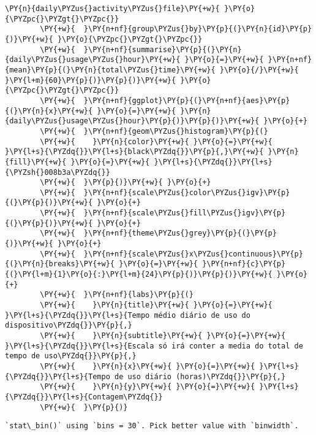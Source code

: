 \begin{tcolorbox}[breakable, size=fbox, boxrule=1pt, pad at break*=1mm,colback=cellbackground, colframe=cellborder]
    \begin{Verbatim}[commandchars=\\\{\}]
        \PY{n}{daily\PYZus{}activity\PYZus{}file}\PY{+w}{ }\PY{o}{\PYZpc{}\PYZgt{}\PYZpc{}}
        \PY{+w}{  }\PY{n+nf}{group\PYZus{}by}\PY{p}{(}\PY{n}{id}\PY{p}{)}\PY{+w}{ }\PY{o}{\PYZpc{}\PYZgt{}\PYZpc{}}
        \PY{+w}{  }\PY{n+nf}{summarise}\PY{p}{(}\PY{n}{daily\PYZus{}usage\PYZus{}hour}\PY{+w}{ }\PY{o}{=}\PY{+w}{ }\PY{n+nf}{mean}\PY{p}{(}\PY{n}{total\PYZus{}time}\PY{+w}{ }\PY{o}{/}\PY{+w}{ }\PY{l+m}{60}\PY{p}{)}\PY{p}{)}\PY{+w}{ }\PY{o}{\PYZpc{}\PYZgt{}\PYZpc{}}
        \PY{+w}{  }\PY{n+nf}{ggplot}\PY{p}{(}\PY{n+nf}{aes}\PY{p}{(}\PY{n}{x}\PY{+w}{ }\PY{o}{=}\PY{+w}{ }\PY{n}{daily\PYZus{}usage\PYZus{}hour}\PY{p}{)}\PY{p}{)}\PY{+w}{ }\PY{o}{+}
        \PY{+w}{  }\PY{n+nf}{geom\PYZus{}histogram}\PY{p}{(}
        \PY{+w}{    }\PY{n}{color}\PY{+w}{ }\PY{o}{=}\PY{+w}{ }\PY{l+s}{\PYZdq{}}\PY{l+s}{black\PYZdq{}}\PY{p}{,}\PY{+w}{ }\PY{n}{fill}\PY{+w}{ }\PY{o}{=}\PY{+w}{ }\PY{l+s}{\PYZdq{}}\PY{l+s}{\PYZsh{}008b3a\PYZdq{}}
        \PY{+w}{  }\PY{p}{)}\PY{+w}{ }\PY{o}{+}
        \PY{+w}{  }\PY{n+nf}{scale\PYZus{}color\PYZus{}igv}\PY{p}{(}\PY{p}{)}\PY{+w}{ }\PY{o}{+}
        \PY{+w}{  }\PY{n+nf}{scale\PYZus{}fill\PYZus{}igv}\PY{p}{(}\PY{p}{)}\PY{+w}{ }\PY{o}{+}
        \PY{+w}{  }\PY{n+nf}{theme\PYZus{}grey}\PY{p}{(}\PY{p}{)}\PY{+w}{ }\PY{o}{+}
        \PY{+w}{  }\PY{n+nf}{scale\PYZus{}x\PYZus{}continuous}\PY{p}{(}\PY{n}{breaks}\PY{+w}{ }\PY{o}{=}\PY{+w}{ }\PY{n+nf}{c}\PY{p}{(}\PY{l+m}{1}\PY{o}{:}\PY{l+m}{24}\PY{p}{)}\PY{p}{)}\PY{+w}{ }\PY{o}{+}
        \PY{+w}{  }\PY{n+nf}{labs}\PY{p}{(}
        \PY{+w}{    }\PY{n}{title}\PY{+w}{ }\PY{o}{=}\PY{+w}{ }\PY{l+s}{\PYZdq{}}\PY{l+s}{Tempo médio diário de uso do dispositivo\PYZdq{}}\PY{p}{,}
        \PY{+w}{    }\PY{n}{subtitle}\PY{+w}{ }\PY{o}{=}\PY{+w}{ }\PY{l+s}{\PYZdq{}}\PY{l+s}{Escala só irá conter a media do total de tempo de uso\PYZdq{}}\PY{p}{,}
        \PY{+w}{    }\PY{n}{x}\PY{+w}{ }\PY{o}{=}\PY{+w}{ }\PY{l+s}{\PYZdq{}}\PY{l+s}{Tempo de uso diário (horas)\PYZdq{}}\PY{p}{,}
        \PY{+w}{    }\PY{n}{y}\PY{+w}{ }\PY{o}{=}\PY{+w}{ }\PY{l+s}{\PYZdq{}}\PY{l+s}{Contagem\PYZdq{}}
        \PY{+w}{  }\PY{p}{)}
    \end{Verbatim}
\end{tcolorbox}

\begin{Verbatim}[commandchars=\\\{\}]
    `stat\_bin()` using `bins = 30`. Pick better value with `binwidth`.
\end{Verbatim}

